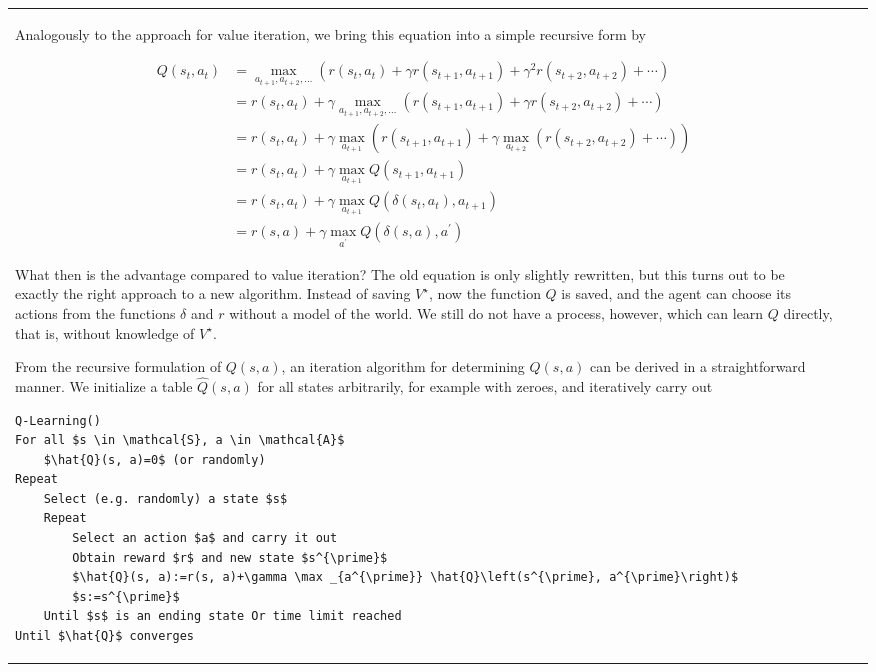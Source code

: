 \documentclass[10pt]{book}
\begin{document}
\begin{center}
\begin{tabular}{|l|l|l|}
Analogously to the approach for value iteration, we bring this equation into a simple recursive form by

\begin{align*}
Q\left(s_{t}, a_{t}\right) & =\max _{a_{t+1}, a_{t+2}, \ldots}\left(r\left(s_{t}, a_{t}\right)+\gamma r\left(s_{t+1}, a_{t+1}\right)+\gamma^{2} r\left(s_{t+2}, a_{t+2}\right)+\cdots\right) \\
& =r\left(s_{t}, a_{t}\right)+\gamma \max _{a_{t+1}, a_{t+2}, \ldots}\left(r\left(s_{t+1}, a_{t+1}\right)+\gamma r\left(s_{t+2}, a_{t+2}\right)+\cdots\right) \\
& =r\left(s_{t}, a_{t}\right)+\gamma \max _{a_{t+1}}\left(r\left(s_{t+1}, a_{t+1}\right)+\gamma \max _{a_{t+2}}\left(r\left(s_{t+2}, a_{t+2}\right)+\cdots\right)\right) \\
& =r\left(s_{t}, a_{t}\right)+\gamma \max _{a_{t+1}} Q\left(s_{t+1}, a_{t+1}\right) \\
& =r\left(s_{t}, a_{t}\right)+\gamma \max _{a_{t+1}} Q\left(\delta\left(s_{t}, a_{t}\right), a_{t+1}\right) \\
& =r(s, a)+\gamma \max _{a^{\prime}} Q\left(\delta(s, a), a^{\prime}\right) \tag{10.11}
\end{align*}

What then is the advantage compared to value iteration? The old equation is only slightly rewritten, but this turns out to be exactly the right approach to a new algorithm. Instead of saving $V^{\star}$, now the function $Q$ is saved, and the agent can choose its actions from the functions $\delta$ and $r$ without a model of the world. We still do not have a process, however, which can learn $Q$ directly, that is, without knowledge of $V^{\star}$.

From the recursive formulation of $Q(s, a)$, an iteration algorithm for determining $Q(s, a)$ can be derived in a straightforward manner. We initialize a table $\hat{Q}(s, a)$ for all states arbitrarily, for example with zeroes, and iteratively carry out

\begin{verbatim}
Q-Learning()
For all $s \in \mathcal{S}, a \in \mathcal{A}$
    $\hat{Q}(s, a)=0$ (or randomly)
Repeat
    Select (e.g. randomly) a state $s$
    Repeat
        Select an action $a$ and carry it out
        Obtain reward $r$ and new state $s^{\prime}$
        $\hat{Q}(s, a):=r(s, a)+\gamma \max _{a^{\prime}} \hat{Q}\left(s^{\prime}, a^{\prime}\right)$
        $s:=s^{\prime}$
    Until $s$ is an ending state Or time limit reached
Until $\hat{Q}$ converges
\end{verbatim}


\end{tabular}
\end{center}
\end{document}
